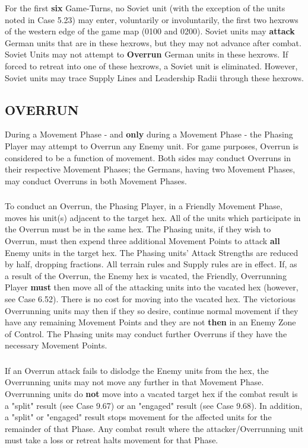 For the first \textbf{six} Game-Turns, no Soviet unit (with the exception of the units noted in Case 5.23) may enter, voluntarily or involuntarily, the first two hexrows of the western edge of the game map (0100 and 0200). Soviet units may \textbf{attack} German units that are in these hexrows, but they may not advance after combat. Soviet Units may not attempt to \textbf{Overrun} German units in these hexrows. If forced to retreat into one of these hexrows, a Soviet unit is eliminated. However, Soviet units may trace Supply Lines and Leadership Radii through these hexrows.

\subsection{OVERRUN}

During a Movement Phase - and \textbf{only} during a Movement Phase - the Phasing Player may attempt to Overrun any Enemy unit. For game purposes, Overrun is considered to be a function of movement. Both sides may conduct Overruns in their respective Movement Phases; the Germans, having two Movement Phases, may conduct Overruns in both Movement Phases.

\subsubsection{} To conduct an Overrun, the Phasing Player, in a Friendly Movement Phase, moves his unit(s) adjacent to the target hex. All of the units which participate in the Overrun must be in the same hex. The Phasing units, if they wish to Overrun, must then expend three additional Movement Points to attack \textbf{all} Enemy units in the target hex. The Phasing units' Attack Strengths are reduced by half, dropping fractions. All terrain rules and Supply rules are in effect. If, as a result of the Overrun, the Enemy hex is vacated, the Friendly, Overrunning Player \textbf{must} then move all of the attacking units into the vacated hex (however, see Case 6.52). There is no cost for moving into the vacated hex. The victorious Overrunning units may then if they so desire, continue normal movement if they have any remaining Movement Points and they are not \textbf{then} in an Enemy Zone of Control. The Phasing units may conduct further Overruns if they have the necessary Movement Points.

\subsubsection{} If an Overrun attack fails to dislodge the Enemy units from the hex, the Overrunning units may not move any further in that Movement Phase. Overrunning units do \textbf{not} move into a vacated target hex if the combat result is a "split" result (see Case 9.67) or an "engaged" result (see Case 9.68). In addition, a "split" or "engaged" result stops movement for the affected units for the remainder of that Phase. Any combat result where the attacker/Overrunning unit must take a loss or retreat halts movement for that Phase.

